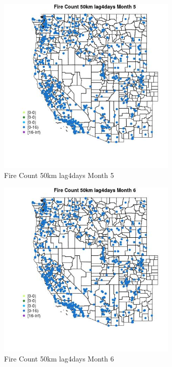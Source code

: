 \begin{figure} 
\centering  
\includegraphics[width=0.77\textwidth]{Code_Outputs/Report_ML_input_PM25_Step4_part_e_de_duplicated_aves_compiled_2019-05-21wNAs_MapObsMo5Fire_Count_50km_lag4days.jpg} 
\caption{\label{fig:Report_ML_input_PM25_Step4_part_e_de_duplicated_aves_compiled_2019-05-21wNAsMapObsMo5Fire_Count_50km_lag4days}Fire Count 50km lag4days Month 5} 
\end{figure} 
 

\begin{figure} 
\centering  
\includegraphics[width=0.77\textwidth]{Code_Outputs/Report_ML_input_PM25_Step4_part_e_de_duplicated_aves_compiled_2019-05-21wNAs_MapObsMo6Fire_Count_50km_lag4days.jpg} 
\caption{\label{fig:Report_ML_input_PM25_Step4_part_e_de_duplicated_aves_compiled_2019-05-21wNAsMapObsMo6Fire_Count_50km_lag4days}Fire Count 50km lag4days Month 6} 
\end{figure} 
 

